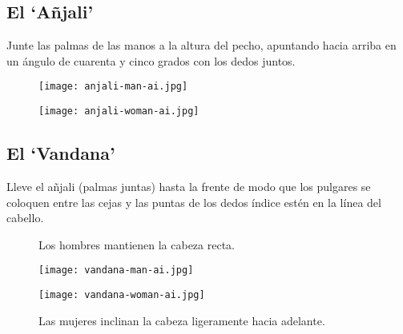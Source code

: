 \subsection{El ‘Añjali'}

Junte las palmas de las manos a la altura del pecho, apuntando hacia arriba en un ángulo de cuarenta y cinco grados con los dedos juntos.
\begin{figure}[h]
	\centering
	
	\begin{minipage}{0.40\textwidth}
		\centering
		\texttt{[image: anjali-man-ai.jpg]}
	\end{minipage}
	\hfill
	\begin{minipage}{0.40\textwidth}
		\centering
		\texttt{[image: anjali-woman-ai.jpg]}
	\end{minipage}
	
\end{figure}

\subsection{El ‘Vandana'}

Lleve el añjali (palmas juntas) hasta la frente de modo que los pulgares se coloquen entre las cejas y las puntas de los dedos índice estén en la línea del cabello.

\begin{figure}[h]
	\centering
	
	\begin{minipage}{0.40\textwidth}
		\centering
		\caption{Los hombres mantienen la cabeza recta.}
		\texttt{[image: vandana-man-ai.jpg]}
	\end{minipage}
	\hfill
	\begin{minipage}{0.40\textwidth}
		\centering
		\caption{Las mujeres inclinan la cabeza ligeramente hacia adelante.}
		\texttt{[image: vandana-woman-ai.jpg]}

	\end{minipage}
\end{figure}
\enlargethispage{3\baselineskip}
